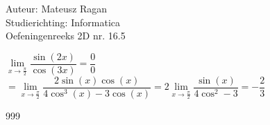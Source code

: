 \documentclass[a4paper]{article}
\begin{document}
\noindent \large Auteur: Mateusz Ragan \\
\noindent \large Studierichting: Informatica\\
\noindent \large Oefeningenreeks 2D nr. 16.5\\

\medskip

\normalsize
$\lim\limits_{x\rightarrow \tfrac{\pi}{2}} \dfrac{\sin(2x)}{\cos(3x)} = \dfrac{0}{0}$\\

$= \lim\limits_{x\rightarrow \tfrac{\pi}{2}} \dfrac{2\sin(x)\cos(x)}{4\cos^3(x)-3\cos(x)} = 2\lim\limits_{x\rightarrow \tfrac{\pi}{2}} \dfrac{\sin(x)}{4\cos^2-3} = -\dfrac{2}{3}$

\begin{thebibliography}{999}
\end{thebibliography}
\end{document}

